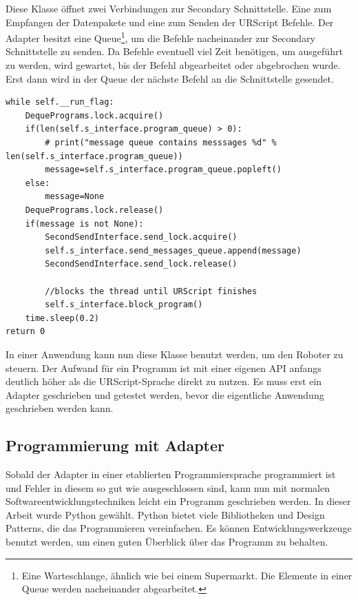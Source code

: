 Diese Klasse öffnet zwei Verbindungen zur Secondary Schnittstelle. Eine zum Empfangen der Datenpakete und eine zum Senden der URScript Befehle. Der Adapter besitzt eine Queue\footnote{Eine Warteschlange, ähnlich wie bei einem Supermarkt. Die Elemente in einer Queue werden nacheinander abgearbeitet.}, um die Befehle nacheinander zur Secondary Schnittstelle zu senden. Da Befehle eventuell viel Zeit benötigen, um ausgeführt zu werden, wird gewartet, bis der Befehl abgearbeitet oder abgebrochen wurde. Erst dann wird in der Queue der nächste Befehl an die Schnittstelle gesendet.

\begin{lstlisting}[caption={Ausschnitt zeigt die Abarbeitung der Queue}, label=lst:adapter_queue ,captionpos=b] 
while self.__run_flag:
    DequePrograms.lock.acquire()
    if(len(self.s_interface.program_queue) > 0):
        # print("message queue contains messsages %d" % len(self.s_interface.program_queue))
        message=self.s_interface.program_queue.popleft()
    else:
        message=None
    DequePrograms.lock.release()
    if(message is not None):
        SecondSendInterface.send_lock.acquire()
        self.s_interface.send_messages_queue.append(message)
        SecondSendInterface.send_lock.release()

        //blocks the thread until URScript finishes
        self.s_interface.block_program()
    time.sleep(0.2)
return 0
\end{lstlisting}

In einer Anwendung kann nun diese Klasse benutzt werden, um den Roboter zu steuern.
Der Aufwand für ein Programm ist mit einer eigenen API anfangs deutlich höher als die URScript-Sprache direkt zu nutzen. Es muss erst ein Adapter geschrieben und getestet werden, bevor die eigentliche Anwendung geschrieben werden kann. 

\subsection{Programmierung mit Adapter}
\label{programmierung_mit_hoerherer_schicht}

Sobald der Adapter in einer etablierten Programmiersprache programmiert ist und Fehler in diesem so gut wie ausgeschlossen sind, kann nun mit normalen Softwareentwicklungstechniken leicht ein Programm geschrieben werden. In dieser Arbeit wurde Python gewählt. Python bietet viele Bibliotheken und Design Patterns, die das Programmieren vereinfachen. Es können Entwicklungswerkzeuge benutzt werden, um einen guten Überblick über das Programm zu behalten.

